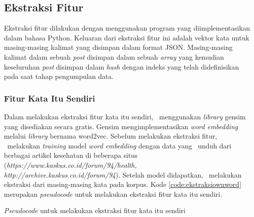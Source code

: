 \subsection{Ekstraksi Fitur}
Ekstraksi fitur dilakukan dengan menggunakan program yang diimplementasikan dalam bahasa Python. Keluaran dari ekstraksi fitur ini adalah vektor kata untuk masing-masing kalimat yang disimpan dalam format JSON. Masing-masing kalimat dalam sebuah \textit{post} disimpan dalam sebuah \textit{array} yang kemudian keseluruhan \textit{post} disimpan dalam \textit{hash} dengan indeks yang telah didefinisikan pada saat tahap pengumpulan data.

\subsubsection{Fitur Kata Itu Sendiri}
Dalam melakukan ekstraksi fitur kata itu sendiri, \saya~menggunakan \textit{library} gensim \citep{rehurek_lrec} yang disediakan secara gratis. Gensim mengimplementasikan \textit{word embedding} melalui \textit{library} bernama word2vec. Sebelum melakukan ekstraksi fitur, \saya~melakukan \textit{training} model \textit{word embedding} dengan data yang \saya~unduh dari berbagai artikel kesehatan di beberapa situs (\textit{https://www.kaskus.co.id/forum/94/health, http://archive.kaskus.co.id/forum/94}). Setelah model didapatkan, \saya~melakukan ekstraksi dari masing-masing kata pada korpus. Kode \ref{code:ekstraksiownword} merupakan \textit{pseudocode} untuk melakukan ekstraksi fitur kata itu sendiri.

\begin{kode}

	
	\caption{\textit{Pseudocode} untuk melakukan ekstraksi fitur kata itu sendiri}
	\label{code:ekstraksiownword}
\end{kode}

